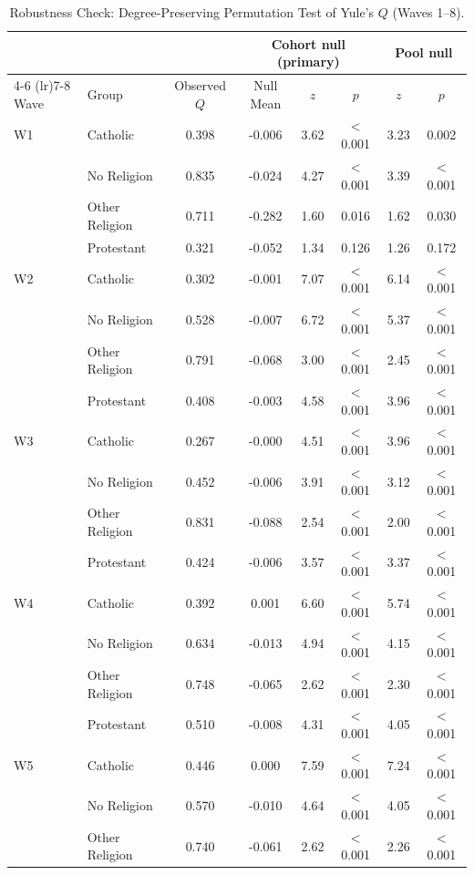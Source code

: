 \begin{table}[htbp]
\caption{Robustness Check: Degree-Preserving Permutation Test of Yule's $Q$ (Waves 1--8).}
\label{tab:yules-q-null}
\centering
\footnotesize
\begin{tabular}{llcccccc}
\toprule
 & & & \multicolumn{3}{c}{Cohort null (primary)} & \multicolumn{2}{c}{Pool null} \\
\cmidrule(lr){4-6} \cmidrule(lr){7-8}
Wave & Group & Observed $Q$ & Null Mean & $z$ & $p$ & $z$ & $p$ \\
\midrule
W1 & Catholic & 0.398 & -0.006 & 3.62 & $<$0.001 & 3.23 & 0.002 \\
 & No Religion & 0.835 & -0.024 & 4.27 & $<$0.001 & 3.39 & $<$0.001 \\
 & Other Religion & 0.711 & -0.282 & 1.60 & 0.016 & 1.62 & 0.030 \\
 & Protestant & 0.321 & -0.052 & 1.34 & 0.126 & 1.26 & 0.172 \\
\addlinespace
W2 & Catholic & 0.302 & -0.001 & 7.07 & $<$0.001 & 6.14 & $<$0.001 \\
 & No Religion & 0.528 & -0.007 & 6.72 & $<$0.001 & 5.37 & $<$0.001 \\
 & Other Religion & 0.791 & -0.068 & 3.00 & $<$0.001 & 2.45 & $<$0.001 \\
 & Protestant & 0.408 & -0.003 & 4.58 & $<$0.001 & 3.96 & $<$0.001 \\
\addlinespace
W3 & Catholic & 0.267 & -0.000 & 4.51 & $<$0.001 & 3.96 & $<$0.001 \\
 & No Religion & 0.452 & -0.006 & 3.91 & $<$0.001 & 3.12 & $<$0.001 \\
 & Other Religion & 0.831 & -0.088 & 2.54 & $<$0.001 & 2.00 & $<$0.001 \\
 & Protestant & 0.424 & -0.006 & 3.57 & $<$0.001 & 3.37 & $<$0.001 \\
\addlinespace
W4 & Catholic & 0.392 & 0.001 & 6.60 & $<$0.001 & 5.74 & $<$0.001 \\
 & No Religion & 0.634 & -0.013 & 4.94 & $<$0.001 & 4.15 & $<$0.001 \\
 & Other Religion & 0.748 & -0.065 & 2.62 & $<$0.001 & 2.30 & $<$0.001 \\
 & Protestant & 0.510 & -0.008 & 4.31 & $<$0.001 & 4.05 & $<$0.001 \\
\addlinespace
W5 & Catholic & 0.446 & 0.000 & 7.59 & $<$0.001 & 7.24 & $<$0.001 \\
 & No Religion & 0.570 & -0.010 & 4.64 & $<$0.001 & 4.05 & $<$0.001 \\
 & Other Religion & 0.740 & -0.061 & 2.62 & $<$0.001 & 2.26 & $<$0.001 \\

\end{tabular}
\end{table}
